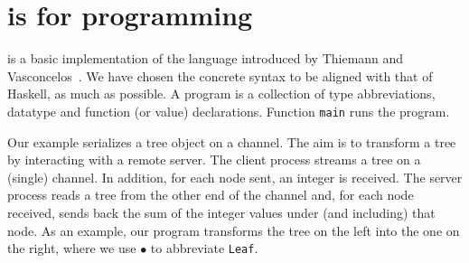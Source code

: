 \section{\freest{} is for programming}
\label{sec:programming}
 
\freest{} is a basic implementation of the language introduced by
Thiemann and Vasconcelos~\cite{DBLP:conf/icfp/ThiemannV16}.
%
We have chosen the concrete syntax to be aligned with that of Haskell,
as much as possible. A \freest{} program is a collection of type
abbreviations, datatype and function (or value) declarations. Function
\lstinline|main| runs the program.

Our example serializes a tree object on a channel. The aim is to
transform a tree by interacting with a remote server. The client
process streams a tree on a (single) channel. In addition, for each
node sent, an integer is received. The server process reads a tree
from the other end of the channel and, for each node received, sends
back the sum of the integer values under (and including) that
node.
%
\newcommand{\leaf}{$\bullet$}
%
As an example, our program transforms the tree on the left into the one
on the right, where we use \leaf{} to abbreviate \lstinline|Leaf|.

